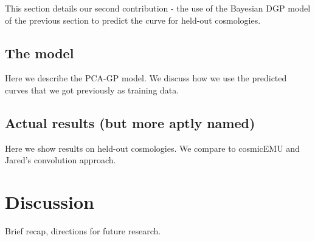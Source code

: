 \documentclass[11pt]{article}
\begin{document}
This section details our second contribution - the use of the Bayesian DGP model of the previous section to predict the curve for held-out cosmologies.

\subsection{The model}

Here we describe the PCA-GP model.  We discuss how we use the predicted curves that we got previously as training data.

\subsection{Actual results (but more aptly named)}

Here we show results on held-out cosmologies.  We compare to cosmicEMU and Jared's convolution approach.

\section{Discussion}

Brief recap, directions for future research.



\end{document}
